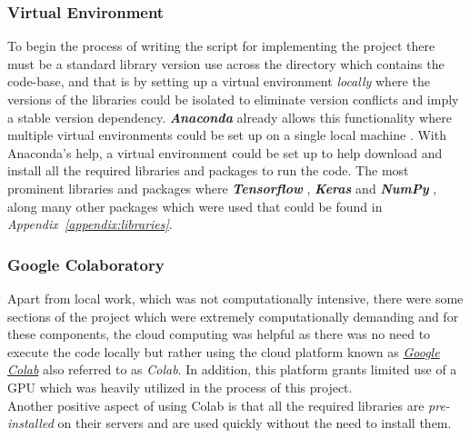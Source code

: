 \documentclass[12pt]{extarticle}
\begin{document}
	\subsubsection{Virtual Environment}
	To begin the process of writing the script for implementing the project there must be a standard library version use across the directory which contains the code-base, and that is by setting up a virtual environment \emph{locally} where the versions of the libraries could be isolated to eliminate version conflicts and imply a stable version dependency. \textbf{\textit{Anaconda}} already allows this functionality where multiple virtual environments could be set up on a single local machine \cite{anaconda}. With Anaconda's help, a virtual environment could be set up to help download and install all the required libraries and packages to run the code. The most prominent libraries and packages where \textbf{\textit{Tensorflow}} \cite{tensorflow2015-whitepaper}, \textbf{\textit{Keras}} \cite{chollet2015keras} and \textbf{\textit{NumPy}} \cite{harris2020array}, along many other packages which were used that could be found in \emph{Appendix~\ref{appendix:libraries}}.
	
	\subsubsection{Google Colaboratory}
	Apart from local work, which was not computationally intensive, there were some sections of the project which were extremely computationally demanding and for these components, the cloud computing was helpful as there was no need to execute the code locally but rather using the cloud platform known as \emph{\href{https://research.google.com/colaboratory/}{Google Colab}} also referred to as \emph{Colab}. In addition, this platform grants limited use of a GPU which was heavily utilized in the process of this project.\\
	Another positive aspect of using Colab is that all the required libraries are \textit{pre-installed} on their servers and are used quickly without the need to install them.
	
	
\end{document}
